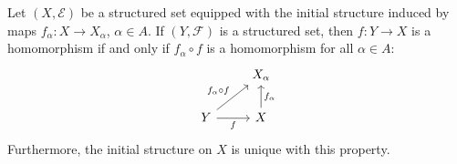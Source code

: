 \documentclass[article, a4paper, 11pt, oneside]{memoir}
\numberwithin{equation}{chapter}
\newcommand{\calE}{\mathcal{E}}
\newcommand{\calF}{\mathcal{F}}
\begin{document}
\begin{theorem}
    \label{thm:initial_characteristic_property}
    Let $(X,\calE)$ be a structured set equipped with the initial structure induced by maps $f_\alpha \colon X \to X_\alpha$,  $\alpha \in A$. If $(Y,\calF)$ is a structured set, then $f \colon Y \to X$ is a homomorphism if and only if $f_\alpha \circ f$ is a homomorphism for all $\alpha \in A$:
    \begin{equation*}
        \begin{tikzcd}
            & X_\alpha \\
            Y
                \ar[r, "f", swap]
                \ar[ur, "f_\alpha \circ f"]
            & X
                \ar[u, "f_\alpha", swap]
        \end{tikzcd}
    \end{equation*}
    Furthermore, the initial structure on $X$ is unique with this property.
\end{theorem}
\end{document}
